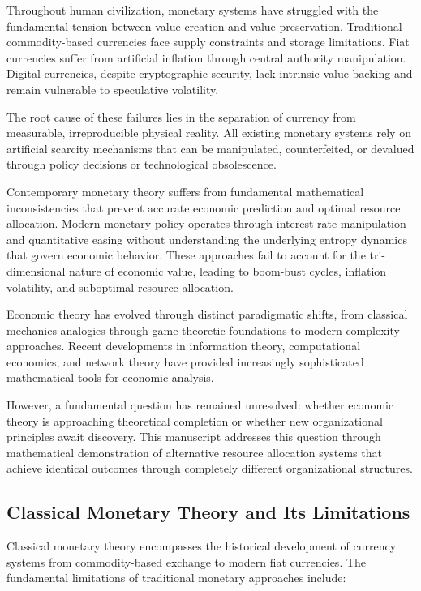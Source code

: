 \documentclass[12pt,a4paper]{article}
\begin{document}
Throughout human civilization, monetary systems have struggled with the fundamental tension between value creation and value preservation. Traditional commodity-based currencies face supply constraints and storage limitations. Fiat currencies suffer from artificial inflation through central authority manipulation. Digital currencies, despite cryptographic security, lack intrinsic value backing and remain vulnerable to speculative volatility.

The root cause of these failures lies in the separation of currency from measurable, irreproducible physical reality. All existing monetary systems rely on artificial scarcity mechanisms that can be manipulated, counterfeited, or devalued through policy decisions or technological obsolescence.

Contemporary monetary theory suffers from fundamental mathematical inconsistencies that prevent accurate economic prediction and optimal resource allocation. Modern monetary policy operates through interest rate manipulation and quantitative easing without understanding the underlying entropy dynamics that govern economic behavior. These approaches fail to account for the tri-dimensional nature of economic value, leading to boom-bust cycles, inflation volatility, and suboptimal resource allocation.

Economic theory has evolved through distinct paradigmatic shifts, from classical mechanics analogies through game-theoretic foundations to modern complexity approaches. Recent developments in information theory, computational economics, and network theory have provided increasingly sophisticated mathematical tools for economic analysis.

However, a fundamental question has remained unresolved: whether economic theory is approaching theoretical completion or whether new organizational principles await discovery. This manuscript addresses this question through mathematical demonstration of alternative resource allocation systems that achieve identical outcomes through completely different organizational structures.

\subsection{Classical Monetary Theory and Its Limitations}

Classical monetary theory encompasses the historical development of currency systems from commodity-based exchange to modern fiat currencies. The fundamental limitations of traditional monetary approaches include:
\end{document}
